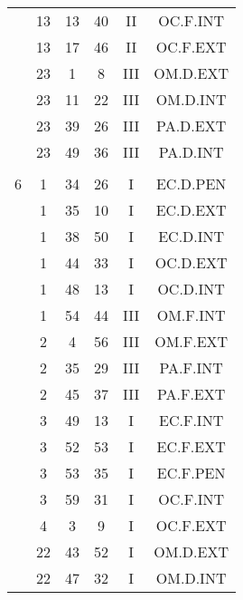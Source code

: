 \documentclass[12pt, a4paper]{article}
\begin{document}
\begin{multicols}{3}
{\begin{tabular}{c c c c c c}
	 	 	 	 & 13 & 13 & 40 & II & OC.F.INT\\%
	 	 	 	 & 13 & 17 & 46 & II & OC.F.EXT\\%
	 	 	 	 & 23 & 1 & 8 & III & OM.D.EXT\\%
	 	 	 	 & 23 & 11 & 22 & III & OM.D.INT\\%
	 	 	 	 & 23 & 39 & 26 & III & PA.D.EXT\\%
	 	 	 	 & 23 & 49 & 36 & III & PA.D.INT\\%
	 	 	 	 & & & & & \\%
	 	 	 	6 & 1 & 34 & 26 & I & EC.D.PEN\\%
	 	 	 	 & 1 & 35 & 10 & I & EC.D.EXT\\%
	 	 	 	 & 1 & 38 & 50 & I & EC.D.INT\\%
	 	 	 	 & 1 & 44 & 33 & I & OC.D.EXT\\%
	 	 	 	 & 1 & 48 & 13 & I & OC.D.INT\\%
	 	 	 	 & 1 & 54 & 44 & III & OM.F.INT\\%
	 	 	 	 & 2 & 4 & 56 & III & OM.F.EXT\\%
	 	 	 	 & 2 & 35 & 29 & III & PA.F.INT\\%
	 	 	 	 & 2 & 45 & 37 & III & PA.F.EXT\\%
	 	 	 	 & 3 & 49 & 13 & I & EC.F.INT\\%
	 	 	 	 & 3 & 52 & 53 & I & EC.F.EXT\\%
	 	 	 	 & 3 & 53 & 35 & I & EC.F.PEN\\%
	 	 	 	 & 3 & 59 & 31 & I & OC.F.INT\\%
	 	 	 	 & 4 & 3 & 9 & I & OC.F.EXT\\%
	 	 	 	 & 22 & 43 & 52 & I & OM.D.EXT\\%
	 	 	 	 & 22 & 47 & 32 & I & OM.D.INT\\%

\end{tabular}}
\end{multicols}
\end{document}
